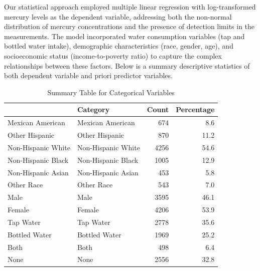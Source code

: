 \documentclass[
  letterpaper,
  DIV=11,
  numbers=noendperiod]{scrartcl}
\begin{document}
Our statistical approach employed multiple linear regression with
log-transformed mercury levels as the dependent variable, addressing
both the non-normal distribution of mercury concentrations and the
presence of detection limits in the measurements. The model incorporated
water consumption variables (tap and bottled water intake), demographic
characteristics (race, gender, age), and socioeconomic status
(income-to-poverty ratio) to capture the complex relationships between
these factors. Below is a summary descriptive statistics of both
dependent variable and priori predictor variables.

\begin{table}[!h]
\centering
\caption{Summary Statistics of Variables}
\centering
{}
\end{table}

\begin{table}[!h]
\centering
\caption{Summary Table for Categorical Variables}
\centering
\fontsize{10}{12}\selectfont
\begin{tabular}[t]{llrr}
\toprule
  & Category & Count & Percentage\\
\midrule
Mexican American & Mexican American & 674 & 8.6\\
Other Hispanic & Other Hispanic & 870 & 11.2\\
Non-Hispanic White & Non-Hispanic White & 4256 & 54.6\\
Non-Hispanic Black & Non-Hispanic Black & 1005 & 12.9\\
Non-Hispanic Asian & Non-Hispanic Asian & 453 & 5.8\\
\addlinespace
Other Race & Other Race & 543 & 7.0\\
Male & Male & 3595 & 46.1\\
Female & Female & 4206 & 53.9\\
Tap Water & Tap Water & 2778 & 35.6\\
Bottled Water & Bottled Water & 1969 & 25.2\\
\addlinespace
Both & Both & 498 & 6.4\\
None & None & 2556 & 32.8\\
\bottomrule
\end{tabular}
\end{table}
\end{document}
